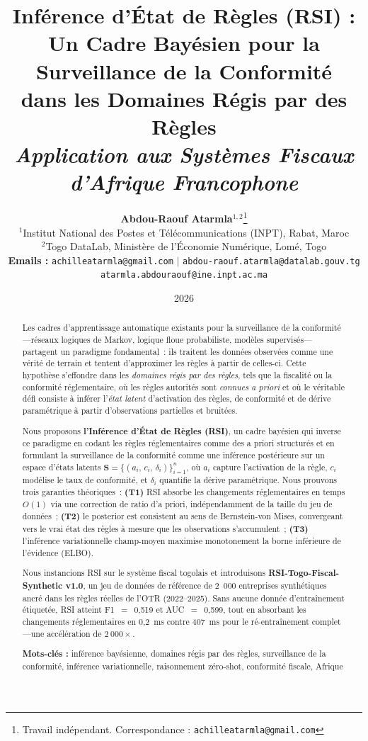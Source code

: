\documentclass[letterpaper]{article}
\title{%
\textbf{Inf\'erence d'\'Etat de R\`egles (RSI) :}\\
\textbf{Un Cadre Bay\'esien pour la Surveillance de la Conformit\'e}\\
\textbf{dans les Domaines R\'egis par des R\`egles}\\[0.4em]
\large\textit{Application aux Syst\`emes Fiscaux d'Afrique Francophone}
}
\author{
    \textbf{Abdou-Raouf Atarmla}$^{1,2}$\thanks{Travail ind\'ependant. Correspondance : \texttt{achilleatarmla@gmail.com}} \\
    \small $^{1}$Institut National des Postes et T\'el\'ecommunications (INPT), Rabat, Maroc \\
    \small $^{2}$Togo DataLab, Minist\`ere de l'\'Economie Num\'erique, Lom\'e, Togo \\
    \small \textbf{Emails :} \texttt{achilleatarmla@gmail.com} $|$ \texttt{abdou-raouf.atarmla@datalab.gouv.tg} \\
    \small \texttt{atarmla.abdouraouf@ine.inpt.ac.ma}
}
\date{2026}
\begin{document}
\maketitle
\thispagestyle{empty}

\begin{abstract}
\noindent
Les cadres d'apprentissage automatique existants pour la surveillance
de la conformit\'e---r\'eseaux logiques de Markov, logique floue
probabiliste, mod\`eles supervis\'es---partagent un paradigme fondamental~:
ils traitent les donn\'ees observ\'ees comme une v\'erit\'e de terrain
et tentent d'approximer les r\`egles \`a partir de celles-ci.
Cette hypoth\`ese s'effondre dans les \emph{domaines r\'egis par des
r\`egles}, tels que la fiscalit\'e ou la conformit\'e r\'eglementaire,
o\`u les r\`egles autorit\'es sont \emph{connues a priori} et o\`u le
v\'eritable d\'efi consiste \`a inf\'erer l'\emph{\'etat latent} d'activation
des r\`egles, de conformit\'e et de d\'erive param\'etrique \`a partir
d'observations partielles et bruit\'ees.

Nous proposons \textbf{l'Inf\'erence d'\'Etat de R\`egles (RSI)}, un
cadre bay\'esien qui inverse ce paradigme en codant les r\`egles
r\'eglementaires comme des a priori structur\'es et en formulant la
surveillance de la conformit\'e comme une inf\'erence post\'erieure sur un
espace d'\'etats latents $\mathbf{S} = \{(a_i,\, c_i,\, \delta_i)\}_{i=1}^n$,
o\`u $a_i$ capture l'activation de la r\`egle, $c_i$ mod\'elise le taux
de conformit\'e, et $\delta_i$ quantifie la d\'erive param\'etrique.
Nous prouvons trois garanties th\'eoriques~:
\textbf{(T1)} RSI absorbe les changements r\'eglementaires en temps $O(1)$
via une correction de ratio d'a priori, ind\'ependamment de la taille
du jeu de donn\'ees~;
\textbf{(T2)} le posterior est consistent au sens de Bernstein-von Mises,
convergeant vers le vrai \'etat des r\`egles \`a mesure que les
observations s'accumulent~;
\textbf{(T3)} l'inf\'erence variationnelle champ-moyen maximise
monotonement la borne inf\'erieure de l'\'evidence (ELBO).

Nous instancions RSI sur le syst\`eme fiscal togolais et introduisons
\textbf{RSI-Togo-Fiscal-Synthetic v1.0}, un jeu de donn\'ees de r\'ef\'erence
de 2~000 entreprises synth\'etiques ancr\'e dans les r\`egles r\'eelles de
l'OTR (2022--2025). Sans aucune donn\'ee d'entra\^inement \'etiquet\'ee,
RSI atteint F1~$=$~0,519 et AUC~$=$~0,599, tout en absorbant les changements
r\'eglementaires en 0,2~ms contre 407~ms pour le r\'e-entra\^inement
complet---une acc\'el\'eration de $2~000\times$.

\medskip
\noindent\textbf{Mots-cl\'es :} inf\'erence bay\'esienne, domaines r\'egis
par des r\`egles, surveillance de la conformit\'e, inf\'erence variationnelle,
raisonnement z\'ero-shot, conformit\'e fiscale, Afrique
\end{abstract}
\end{document}
